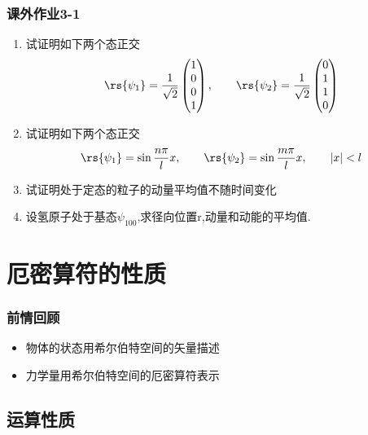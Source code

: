 \begin{frame}
    \frametitle{课外作业3-1}
    \begin{enumerate}
        \item 试证明如下两个态正交
        \[\rs{\psi_1}=\frac{1}{\sqrt{2}}
        \begin{pmatrix}
            1 \\ 
            0 \\  
            0 \\ 
            1 
        \end{pmatrix}, \qquad  \rs{\psi_2}=\frac{1}{\sqrt{2}}
        \begin{pmatrix}
            0 \\ 
            1 \\  
            1 \\ 
            0 
        \end{pmatrix} \]
        \item 试证明如下两个态正交
        \[ \rs{\psi_1}=\sin \frac{n\pi}{l}x,\qquad \rs{\psi_2}=\sin \frac{m\pi}{l} x,\qquad  \left|x\right|<l      
        \]
        \item 试证明处于定态的粒子的动量平均值不随时间变化
        \item 设氢原子处于基态$\psi_{100}$,求径向位置r,动量和动能的平均值. 
    \end{enumerate}
    
\end{frame}


\section{厄密算符的性质}

\begin{frame}
    \frametitle{前情回顾}
    \begin{itemize}
        \item 物体的状态用希尔伯特空间的矢量描述
        \item 力学量用希尔伯特空间的厄密算符表示
    \end{itemize}
\end{frame} 

\subsection{运算性质}

